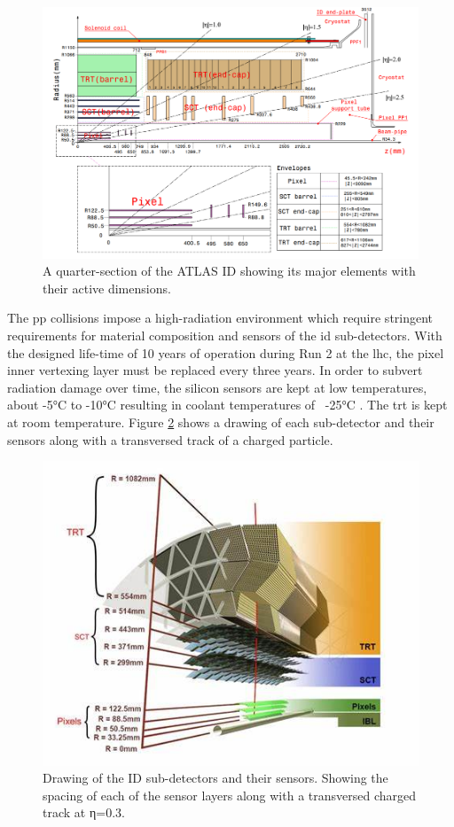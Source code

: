 \begin{figure}[h]
  \centering
  \includegraphics[scale=0.5]{figs/ch3/ID_layout.png}
  \caption{ A quarter-section of the ATLAS ID showing its major elements with their active dimensions. \cite{atlas}}
\label{fig:3.5}
\end{figure}

The \gls{pp} collisions impose a high-radiation environment which require stringent requirements for material composition 
and sensors of the \gls{id} sub-detectors. With the designed life-time of 10 years of operation during Run 2 at the \gls{lhc},
the pixel inner vertexing layer must be replaced every three years. In order to subvert radiation damage over time, the silicon 
sensors are kept at low temperatures, about -5°C to -10°C resulting in coolant temperatures of ~-25°C \cite{atlas}. The \gls{trt}
is kept at room temperature. Figure \ref{fig:3.6} shows a drawing of each sub-detector and their sensors along with a transversed track 
of a charged particle. 

\begin{figure}[h]
  \centering
  \includegraphics[scale=0.8]{figs/ch3/ID_schem.jpeg}
  \caption{ Drawing of the ID sub-detectors and their sensors. Showing the spacing of each of the sensor layers along with a transversed charged track at η=0.3. \cite{atlas}}
\label{fig:3.6}
\end{figure}

